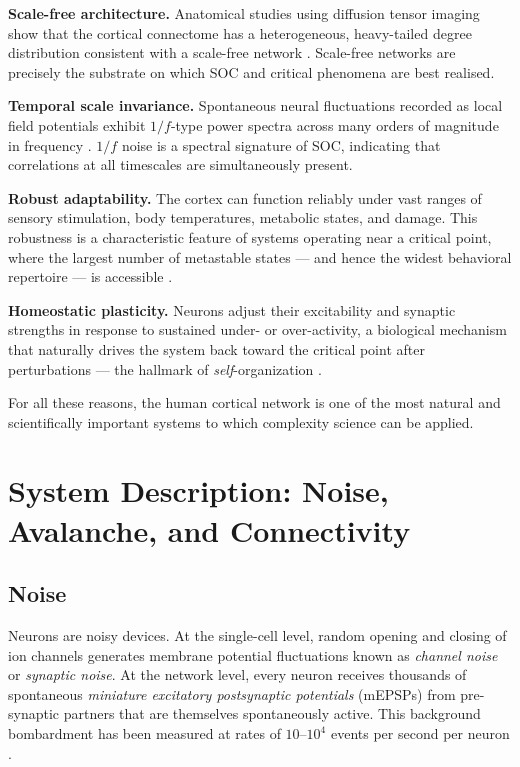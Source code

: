 \documentclass[12pt,a4paper]{article}
\begin{document}
\textbf{Scale-free architecture.}  Anatomical studies using diffusion
tensor imaging show that the cortical connectome has a heterogeneous,
heavy-tailed degree distribution consistent with a scale-free network
\cite{van_den_heuvel2010}.  Scale-free networks are precisely the
substrate on which SOC and critical phenomena are best realised.

\textbf{Temporal scale invariance.}  Spontaneous neural fluctuations
recorded as local field potentials exhibit $1/f$-type power spectra
across many orders of magnitude in frequency \cite{linkenkaer2001}.
$1/f$ noise is a spectral signature of SOC, indicating that
correlations at all timescales are simultaneously present.

\textbf{Robust adaptability.}  The cortex can function reliably under
vast ranges of sensory stimulation, body temperatures, metabolic
states, and damage.  This robustness is a characteristic feature of
systems operating near a critical point, where the largest number of
metastable states — and hence the widest behavioral repertoire — is
accessible \cite{chialvo2010}.

\textbf{Homeostatic plasticity.}  Neurons adjust their excitability
and synaptic strengths in response to sustained under- or
over-activity, a biological mechanism that naturally drives the system
back toward the critical point after perturbations — the hallmark of
\emph{self}-organization \cite{turrigiano2004}.

For all these reasons, the human cortical network is one of the most
natural and scientifically important systems to which complexity
science can be applied.

\section{System Description: Noise, Avalanche, and Connectivity}
\label{sec:description}

\subsection{Noise}

Neurons are noisy devices.  At the single-cell level, random opening
and closing of ion channels generates membrane potential fluctuations
known as \emph{channel noise} or \emph{synaptic noise}.  At the
network level, every neuron receives thousands of spontaneous
\emph{miniature excitatory postsynaptic potentials} (mEPSPs) from
pre-synaptic partners that are themselves spontaneously active.  This
background bombardment has been measured at rates of $10$–$10^{4}$
events per second per neuron \cite{destexhe2003}.
\end{document}
